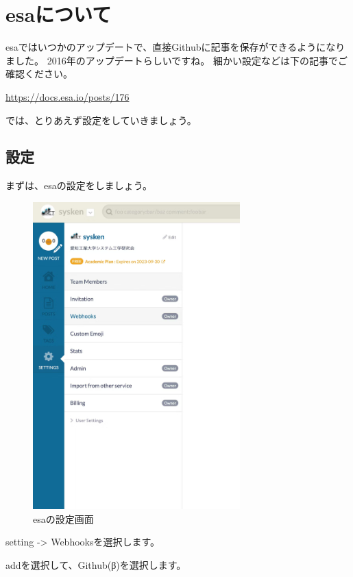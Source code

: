 \chapter{esaについて}

esaではいつかのアップデートで、直接Githubに記事を保存ができるようになりました。
2016年のアップデートらしいですね。
細かい設定などは下の記事でご確認ください。

\url{https://docs.esa.io/posts/176}

では、とりあえず設定をしていきましょう。

\section{設定}

  まずは、esaの設定をしましょう。
  
  \begin{figure}[H]
    \centering
    \includegraphics[width=8cm]{./image/02-chap7/esa-setting.png}
    \caption{esaの設定画面}
    \label{chap7-esa-setting-image}
  \end{figure}

  setting -> Webhooksを選択します。

  addを選択して、Github(β)を選択します。 

